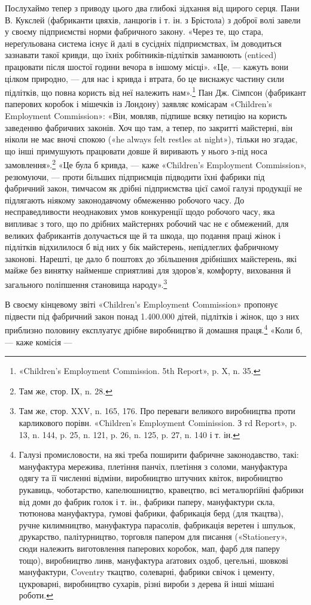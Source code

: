 \parcont{}  %
Послухаймо тепер з приводу цього два глибокі зідхання від щирого серця. Пани
В. Кукслей (фабриканти цвяхів, ланцюгів і т. ін. з Брістола) з доброї волі
завели у своєму підприємстві норми фабричного
закону. «Через те, що стара, нереґульована система існує й далі в сусідніх
підприємствах, їм доводиться зазнавати такої кривди, що їхніх
робітників-підлітків заманюють (enticed) працювати після
шостої години вечора в іншому місці». «Це, — кажуть вони цілком природно, — для
нас і кривда і втрата, бо це виснажує частину сили підлітків, що повна користь
від неї належить нам».\footnote{
«Children's Employment Commission. 5th Report», p. X, n. 35.
} Пан Дж. Сімпсон (фабрикант паперових коробок і мішечків із Лондону) заявляє
комісарам «Children’s Employment Commission»: «Він, мовляв, підпише всяку
петицію на користь заведенню фабричних законів. Хоч що там,
а тепер, по закритті майстерні, він ніколи не має вночі спокою («he always felt
restles at night»), тільки но згадає, що інші примушують працювати довше й
виривають у нього з-під носа замовлення».\footnote{
Там же, стор. ІХ, n. 28.
}
«Це була б кривда, — каже «Children’s Employment Commission», резюмуючи, —
проти більших підприємців підводити їхні фабрики під фабричний закон, тимчасом
як дрібні підприємства цієї самої галузі
продукції не підлягають ніякому законодавчому обмеженню робочого часу. До
несправедливости неоднакових умов конкуренції щодо робочого часу, яка випливає
з того, що по дрібних майстернях робочий час не є обмежений, для великих
фабрикантів долучається ще й та шкода, що подання праці
жінок і підлітків відхилилося б від них у бік майстерень, непідлеглих
фабричному законові. Нарешті, це дало б поштовх до збільшення дрібніших
майстерень, які майже без винятку найменше сприятливі для
здоров’я, комфорту, виховання й загального поліпшення становища народу».\footnote{
Там же, стор. XXV, n. 165, 176. Про переваги великого виробництва проти
карликового порівн. «Children’s Employment Cominission. З rd Report», p. 13,
n. 144, p. 25, n. 121, p. 26, n. 125, p. 27, n. 140 і т. ін.
}

В своєму кінцевому звіті «Children’s Employment Commission» пропонує підвести
під фабричний закон понад \num{1.400.000} дітей, підлітків і жінок, що з них
приблизно половину експлуатує дрібне виробництво
й домашня праця.\footnote{
Галузі промисловости, на які треба поширити фабричне законодавство, такі:
мануфактура мережива, плетіння панчіх, плетіння з соломи, мануфактура одягу
та її численні відміни, виробництво штучних квіток, виробництво рукавиць,
чоботарство, капелюшництво, кравецтво, всі металюрґійні
фабрики від домн до фабрик голок і т. ін., фабрики паперу, мануфактури скла,
тютюнова мануфактура, ґумові фабрики, фабрикація берд (для ткацтва), ручне
килимництво, мануфактура парасолів, фабрикація
веретен і шпульок, друкарство, палітурництво, торговля папером для писання
(«Stationery», сюди належить виготовлення паперових коробок, мап, фарб для
паперу тощо), виробництво линв, мануфактура
аґатових оздоб, цегельні, шовкові мануфактури, Coventry ткацтво, солеварні,
фабрики свічок і цементу, цукроварні, виробництво сухарів, різні вироби з
дерева й інші мішані роботи.
} «Коли б, — каже комісія —
\parbreak{}  %
